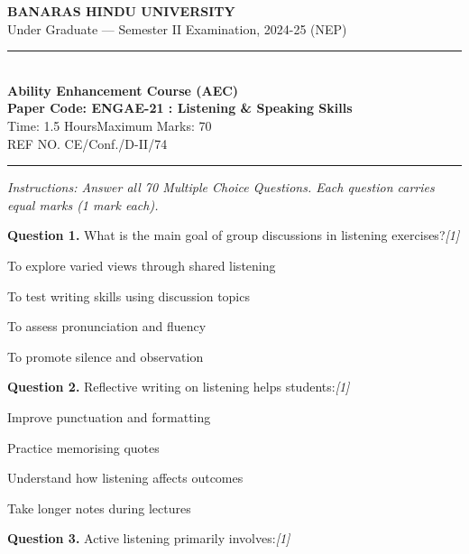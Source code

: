 \documentclass[11pt,a4paper]{article}
\newcommand{\pts}[1]{\hfill   \textit{[#1]}}
\begin{document}
\begin{center}
  {\large\bfseries BANARAS HINDU UNIVERSITY}\\[2pt]
  {\normalsize Under Graduate --- Semester II Examination, 2024-25 (NEP)}\\[6pt]
  \rule{0.8\linewidth}{0.5pt}\\[6pt]
  {\large\bfseries Ability Enhancement Course (AEC)}\\[4pt]
  {\large\bfseries Paper Code: ENGAE-21 : Listening \& Speaking Skills}\\[4pt]
  {\normalsize Time: 1.5 Hours\hfill Maximum Marks: 70}\\[2pt]
  {\small REF NO. CE/Conf./D-II/74}
\end{center}

\rule{\linewidth}{0.4pt}

\smallskip



\noindent   \textit{Instructions: Answer all 70 Multiple Choice Questions. Each question carries equal marks (1 mark each).}

\bigskip


\noindent   \textbf{Question 1.} What is the main goal of group discussions in listening exercises?\pts{1}

\begin{parts}
  \item To explore varied views through shared listening
  \item To test writing skills using discussion topics
  \item To assess pronunciation and fluency
  \item To promote silence and observation
\end{parts}

\medskip


\noindent   \textbf{Question 2.} Reflective writing on listening helps students:\pts{1}

\begin{parts}
  \item Improve punctuation and formatting
  \item Practice memorising quotes
  \item Understand how listening affects outcomes
  \item Take longer notes during lectures
\end{parts}

\medskip


\noindent   \textbf{Question 3.} Active listening primarily involves:\pts{1}
\end{document}
